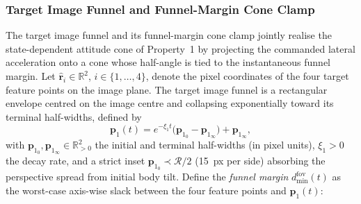 \subsubsection{Target Image Funnel and Funnel-Margin Cone Clamp} \label{fov cone: section}
The target image funnel and its funnel-margin cone clamp jointly realise the state-dependent attitude cone of Property~1 by projecting the commanded lateral acceleration onto a cone whose half-angle is tied to the instantaneous funnel margin. Let $\boldsymbol{\hat{r}}_i\in\mathbb{R}^2$, $i\in\{1,\ldots,4\}$, denote the pixel coordinates of the four target feature points on the image plane. The target image funnel is a rectangular envelope centred on the image centre and collapsing exponentially toward its terminal half-widths, defined by
\begin{equation} \label{rho fov: equation}
    \boldsymbol{p}_1(t) = e^{-\xi_1 t}\big(\boldsymbol{p}_{1_0}-\boldsymbol{p}_{1_\infty}\big) + \boldsymbol{p}_{1_\infty},
\end{equation}
with $\boldsymbol{p}_{1_0},\boldsymbol{p}_{1_\infty}\in\mathbb{R}^2_{>0}$ the initial and terminal half-widths (in pixel units), $\xi_1>0$ the decay rate, and a strict inset $\boldsymbol{p}_{1_0}\prec\mathcal{R}/2$ (15~px per side) absorbing the perspective spread from initial body tilt. Define the \emph{funnel margin} $d_\text{min}^\text{fov}(t)$ as the worst-case axis-wise slack between the four feature points and $\boldsymbol{p}_1(t)$:


